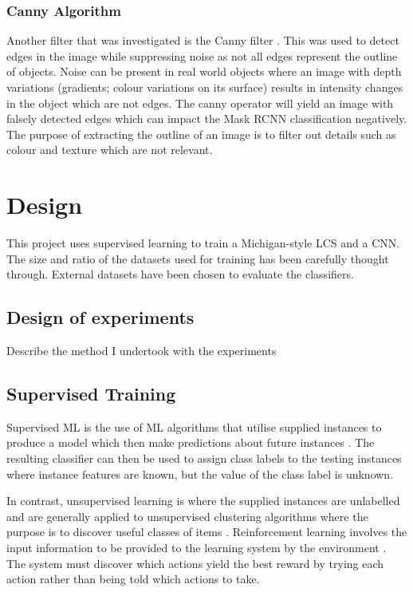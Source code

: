 \subsection{Canny Algorithm}

Another filter that was investigated is the Canny filter \cite{canny1986computational}. This was used to detect edges in the image while suppressing noise as not all edges represent the outline of objects. Noise can be present in real world objects where an image with depth variations (gradients; colour variations on its surface) results in intensity changes in the object which are not edges. The canny operator will yield an image with falsely detected edges which can impact the Mask RCNN classification negatively. The purpose of extracting the outline of an image is to filter out details such as colour and texture which are not relevant.

\chapter{Design}
This project uses supervised learning to train a Michigan-style LCS and a CNN. The size and ratio of the datasets used for training has been carefully thought through. External datasets have been chosen to evaluate the classifiers.

\section{Design of experiments}
Describe the method I undertook with the experiments

\section{Supervised Training}
\label{subsec:supervised}
Supervised ML is the use of ML algorithms that utilise supplied instances to produce a model which then make predictions about future instances \cite{kotsiantis2007supervised}. The resulting classifier can then be used to assign class labels to the testing instances where instance features are known, but the value of the class label is unknown.  

In contrast, unsupervised learning is where the supplied instances are unlabelled and are generally applied to unsupervised clustering algorithms where the purpose is to discover useful classes of items \cite{jain1999data}. 
Reinforcement learning involves the input information to be provided to the learning system by the environment \cite{barto1997reinforcement}. The system must discover which actions yield the best reward by trying each action rather than being told which actions to take. 

